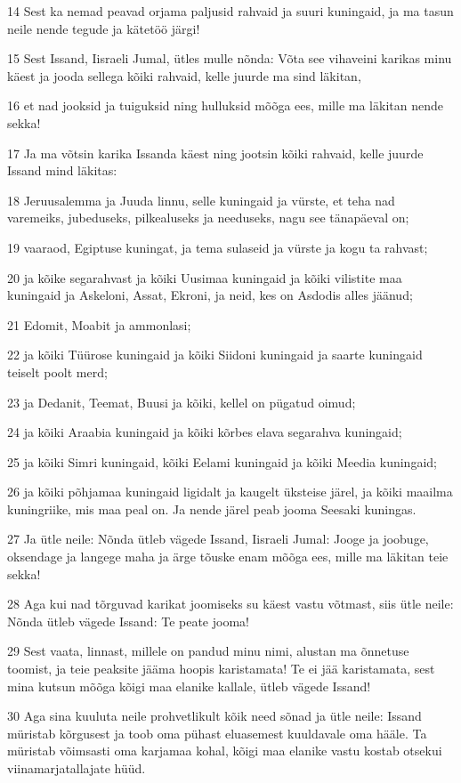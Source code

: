 \par 14 Sest ka nemad peavad orjama paljusid rahvaid ja suuri kuningaid, ja ma tasun neile nende tegude ja kätetöö järgi!
\par 15 Sest Issand, Iisraeli Jumal, ütles mulle nõnda: Võta see vihaveini karikas minu käest ja jooda sellega kõiki rahvaid, kelle juurde ma sind läkitan,
\par 16 et nad jooksid ja tuiguksid ning hulluksid mõõga ees, mille ma läkitan nende sekka!
\par 17 Ja ma võtsin karika Issanda käest ning jootsin kõiki rahvaid, kelle juurde Issand mind läkitas:
\par 18 Jeruusalemma ja Juuda linnu, selle kuningaid ja vürste, et teha nad varemeiks, jubeduseks, pilkealuseks ja needuseks, nagu see tänapäeval on;
\par 19 vaaraod, Egiptuse kuningat, ja tema sulaseid ja vürste ja kogu ta rahvast;
\par 20 ja kõike segarahvast ja kõiki Uusimaa kuningaid ja kõiki vilistite maa kuningaid ja Askeloni, Assat, Ekroni, ja neid, kes on Asdodis alles jäänud;
\par 21 Edomit, Moabit ja ammonlasi;
\par 22 ja kõiki Tüürose kuningaid ja kõiki Siidoni kuningaid ja saarte kuningaid teiselt poolt merd;
\par 23 ja Dedanit, Teemat, Buusi ja kõiki, kellel on pügatud oimud;
\par 24 ja kõiki Araabia kuningaid ja kõiki kõrbes elava segarahva kuningaid;
\par 25 ja kõiki Simri kuningaid, kõiki Eelami kuningaid ja kõiki Meedia kuningaid;
\par 26 ja kõiki põhjamaa kuningaid ligidalt ja kaugelt üksteise järel, ja kõiki maailma kuningriike, mis maa peal on. Ja nende järel peab jooma Seesaki kuningas.
\par 27 Ja ütle neile: Nõnda ütleb vägede Issand, Iisraeli Jumal: Jooge ja joobuge, oksendage ja langege maha ja ärge tõuske enam mõõga ees, mille ma läkitan teie sekka!
\par 28 Aga kui nad tõrguvad karikat joomiseks su käest vastu võtmast, siis ütle neile: Nõnda ütleb vägede Issand: Te peate jooma!
\par 29 Sest vaata, linnast, millele on pandud minu nimi, alustan ma õnnetuse toomist, ja teie peaksite jääma hoopis karistamata! Te ei jää karistamata, sest mina kutsun mõõga kõigi maa elanike kallale, ütleb vägede Issand!
\par 30 Aga sina kuuluta neile prohvetlikult kõik need sõnad ja ütle neile: Issand müristab kõrgusest ja toob oma pühast eluasemest kuuldavale oma hääle. Ta müristab võimsasti oma karjamaa kohal, kõigi maa elanike vastu kostab otsekui viinamarjatallajate hüüd.
